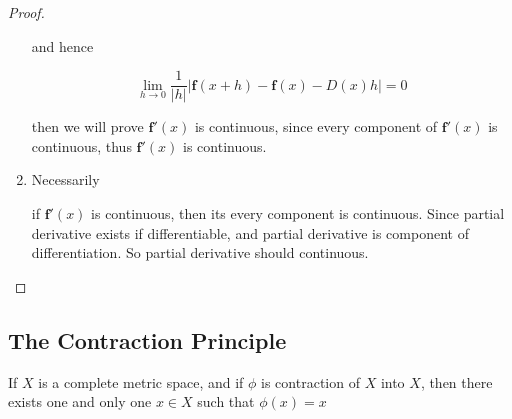 \begin{proof}
\begin{enumerate}
        and hence

        \[
        \lim_{h \to 0}\frac{1}{|h|}\left|\mathbf{f}(x + h) - \mathbf{f}(x) - D(x)h  \right| = 0
        \]

        then we will prove $\mathbf{f}'(x)$ is continuous, since every component of $\mathbf{f}'(x)$
        is continuous, thus $\mathbf{f}'(x)$ is continuous.


    \item Necessarily

    if $\mathbf{f}'(x)$ is continuous, then its every component is continuous. Since partial derivative exists if differentiable, and
    partial derivative is component of differentiation. So partial derivative should continuous.
    \end{enumerate}
\end{proof}

\subsection{The Contraction Principle}

\begin{thm}
    \label{thm:c838d972-8aa6-4a9f-a016-bb59e7e82f45}
    If $X$ is a complete metric space, and if $\phi$ is contraction of $X$
    into $X$, then there exists one and only one $x \in X$ such that $\phi(x) = x$
\end{thm}

